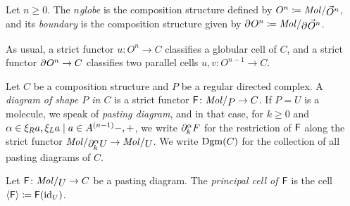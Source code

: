 \begin{dfn} [Globe]
    Let \( n \geq 0 \).
    The \emph{\( n \)\nbd globe} is the composition structure defined by \( \globe{n} \eqdef \molecin{\dglobe{n}} \), and its \emph{boundary} is the composition structure given by \( \bd{}{}\globe{n} \eqdef \molecin{\bd{}{}\dglobe{n}} \).
\end{dfn}

\begin{rmk}
    As usual, a strict functor \( u \colon O^n \to C \) classifies a globular cell of \( C \), and a strict functor \( \partial_{}^{} O^n \to C \) classifies two parallel cells \( u, v \colon O^{n - 1} \to C \).
\end{rmk}

\begin{dfn} 
    Let \( C \) be a composition structure and \( P \) be a regular directed complex.
    A \emph{diagram of shape \( P \) in \( C \)} is a strict functor \( \F \colon \molecin{P} \to C \).
    If \( P = U \) is a molecule, we speak of \emph{pasting diagram}, and in that case, for \( k \geq 0 \) and \( \a \in \set{-, +} \), we write \( \partial_{k}^{\alpha} F \) for the restriction of \( \mathsf{F} \) along the strict functor \( \molecin{\bd{k}{\a} U} \to \molecin{U} \).
    We write \( \operatorname{Dgm}(C) \) for the collection of all pasting diagrams of \( C \).
\end{dfn}

\begin{dfn} 
    Let \( \F \colon \molecin{U} \to C \) be a pasting diagram.
    The \emph{principal cell of \( \mathsf{F} \)} is the cell \( \langle\mathsf{F}\rangle \coloneqq \mathsf{F}(\mathrm{id}_{U}) \).
\end{dfn}

